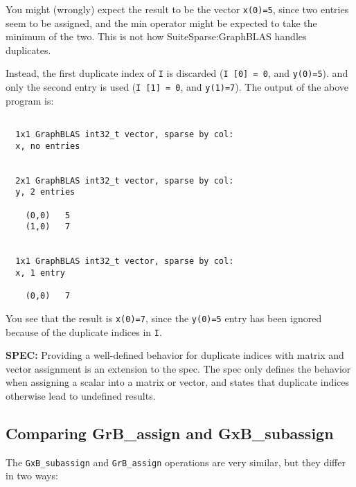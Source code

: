 \documentclass[12pt]{article}
\begin{document}
You might (wrongly) expect the result to be the vector \verb'x(0)=5', since
two entries seem to be assigned, and the min operator might be expected to
take the minimum of the two.  This is not how SuiteSparse:GraphBLAS handles
duplicates.

Instead, the first duplicate index of \verb'I' is discarded
(\verb'I [0] = 0', and \verb'y(0)=5').
and only the second entry is used
(\verb'I [1] = 0', and \verb'y(1)=7').
The output of the above program is:

{\small
\begin{verbatim}

  1x1 GraphBLAS int32_t vector, sparse by col:
  x, no entries


  2x1 GraphBLAS int32_t vector, sparse by col:
  y, 2 entries

    (0,0)   5
    (1,0)   7


  1x1 GraphBLAS int32_t vector, sparse by col:
  x, 1 entry

    (0,0)   7

\end{verbatim}}

You see that the result is \verb'x(0)=7', since the \verb'y(0)=5' entry
has been ignored because of the duplicate indices in \verb'I'.

\begin{alert}
{\bf SPEC:} Providing a well-defined behavior for duplicate
indices with matrix and vector assignment is an extension to the spec.
The spec only defines the behavior when assigning a scalar into a matrix
or vector, and states that duplicate indices otherwise lead to undefined
results.
\end{alert}


\newpage
\subsection{Comparing {\sf GrB\_assign} and {\sf GxB\_subassign}} %
\label{compare_assign}

The \verb'GxB_subassign' and \verb'GrB_assign' operations are very similar, but
they differ in two ways:
\end{document}
